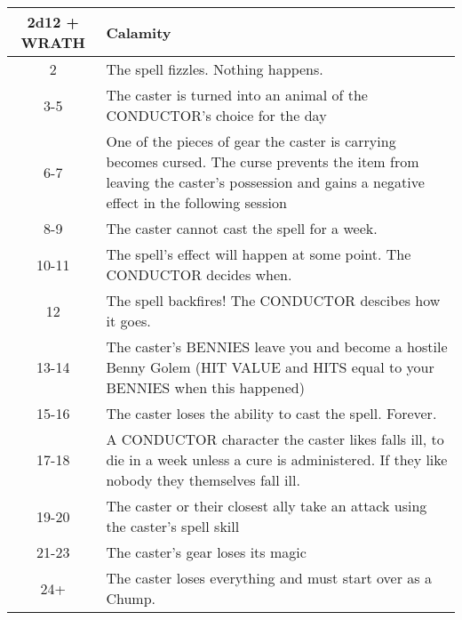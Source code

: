 \begin{adjustbox}{width=\textwidth, keepaspectratio, center}
    \begin{tabular}{|c|p{}|}
    \hline
    \textbf{2d12 + WRATH} & \textbf{Calamity} \\ \hline
    2 & The spell fizzles. Nothing happens. \\ \hline
    3-5 & The caster is turned into an animal of the CONDUCTOR's choice for the day \\ \hline
    6-7 & One of the pieces of gear the caster is carrying becomes cursed. The curse prevents the item from leaving the caster's possession and gains a negative effect in the following session \\ \hline
    8-9 & The caster cannot cast the spell for a week. \\ \hline
    10-11 & The spell's effect will happen at some point. The CONDUCTOR decides when. \\ \hline
    12 & The spell backfires! The CONDUCTOR descibes how it goes. \\ \hline
    13-14 & The caster's BENNIES leave you and become a hostile Benny Golem (HIT VALUE and HITS equal to your BENNIES when this happened) \\ \hline
    15-16 & The caster loses the ability to cast the spell. Forever. \\ \hline
    17-18 & A CONDUCTOR character the caster likes falls ill, to die in a week unless a cure is administered. If they like nobody they themselves fall ill. \\ \hline
    19-20 & The caster or their closest ally take an attack using the caster's spell skill \\ \hline
    21-23 & The caster's gear loses its magic \\ \hline
    24+ & The caster loses everything and must start over as a Chump. \\ \hline
    \end{tabular}
\end{adjustbox}
